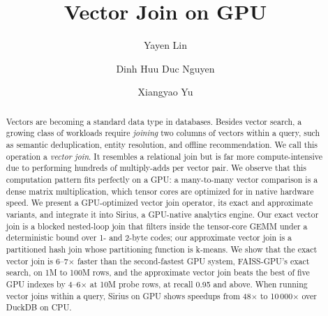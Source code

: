 \documentclass[acmengage]{acmart}
\begin{document}
    \fancyhead{} %
    \fancyfoot{} %
    \fancyfoot[C]{\thepage} %

    \title{Vector Join on GPU} %

    \author{Yayen Lin}

    \author{Dinh Huu Duc Nguyen}
    \authornotemark[1]

    \author{Xiangyao Yu}

    \begin{abstract}
        Vectors are becoming a standard data type in databases. Besides vector search, a growing class of workloads require \textit{joining} two columns of vectors within a query, such as semantic deduplication, entity resolution, and offline recommendation. %
        We call this operation a \emph{vector join}.
        It resembles a relational join but is far more compute-intensive due to performing hundreds of multiply-adds per vector pair.
        We observe that this computation pattern fits perfectly on a GPU: %
        a many-to-many vector comparison is a dense matrix multiplication, which tensor cores are optimized for in native hardware speed. %
        We present a GPU-optimized vector join operator, its exact and approximate variants, and integrate it into Sirius, a GPU-native analytics engine. %
        Our exact vector join is a blocked nested-loop join that filters inside the tensor-core GEMM under a deterministic bound over 1- and 2-byte codes; our approximate vector join is a partitioned hash join whose partitioning function is k-means.
        We show that %
        the exact vector join is 6--7$\times$ faster than the second-fastest GPU system, FAISS-GPU's exact search, on 1M to 100M rows, and the approximate vector join beats the best of five GPU indexes by 4--6$\times$ at 10M probe rows, at recall 0.95 and above.
        When running vector joins within a query, Sirius on GPU shows speedups from 48$\times$ to 10\,000$\times$ over DuckDB on CPU.
    \end{abstract}
\end{document}
